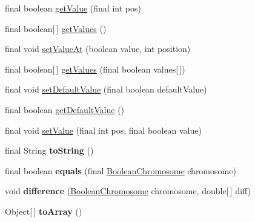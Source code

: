 \begin{DoxyCompactItemize}
\item 
final boolean \hyperlink{classjenes_1_1chromosome_1_1_boolean_chromosome_a6edb214f001732cfd6af9bbac3a23515}{get\-Value} (final int pos)
\item 
final boolean\mbox{[}$\,$\mbox{]} \hyperlink{classjenes_1_1chromosome_1_1_boolean_chromosome_a27db9ee77a97d896d0cdafc726681272}{get\-Values} ()
\item 
final void \hyperlink{classjenes_1_1chromosome_1_1_boolean_chromosome_a9bd35e276f2739f19fa7a695c85f415c}{set\-Value\-At} (boolean value, int position)
\item 
final boolean\mbox{[}$\,$\mbox{]} \hyperlink{classjenes_1_1chromosome_1_1_boolean_chromosome_aafccb6ebf217d02c0502e185b1972f82}{get\-Values} (final boolean values\mbox{[}$\,$\mbox{]})
\item 
final void \hyperlink{classjenes_1_1chromosome_1_1_boolean_chromosome_a3730cbcd4d048349f134593db820566d}{set\-Default\-Value} (final boolean default\-Value)
\item 
final boolean \hyperlink{classjenes_1_1chromosome_1_1_boolean_chromosome_a9b75f626b2b5fbc90215a53ac91d24a7}{get\-Default\-Value} ()
\item 
final void \hyperlink{classjenes_1_1chromosome_1_1_boolean_chromosome_ab37e05ed7a30e43b740f0c2d9c548e88}{set\-Value} (final int pos, final boolean value)
\item 
\hypertarget{classjenes_1_1chromosome_1_1_boolean_chromosome_a17ecce8325cc2ba6b1703551768c245f}{final String {\bfseries to\-String} ()}\label{classjenes_1_1chromosome_1_1_boolean_chromosome_a17ecce8325cc2ba6b1703551768c245f}

\item 
\hypertarget{classjenes_1_1chromosome_1_1_boolean_chromosome_a82b50fe50a7e8821ee3ae5cc96bca013}{final boolean {\bfseries equals} (final \hyperlink{classjenes_1_1chromosome_1_1_boolean_chromosome}{Boolean\-Chromosome} chromosome)}\label{classjenes_1_1chromosome_1_1_boolean_chromosome_a82b50fe50a7e8821ee3ae5cc96bca013}

\item 
\hypertarget{classjenes_1_1chromosome_1_1_boolean_chromosome_a0d602ca5a958ee2712963602d2f1eee9}{void {\bfseries difference} (\hyperlink{classjenes_1_1chromosome_1_1_boolean_chromosome}{Boolean\-Chromosome} chromosome, double\mbox{[}$\,$\mbox{]} diff)}\label{classjenes_1_1chromosome_1_1_boolean_chromosome_a0d602ca5a958ee2712963602d2f1eee9}

\item 
\hypertarget{classjenes_1_1chromosome_1_1_boolean_chromosome_a3ff06b819a640b0e89935d99cc69d3ac}{Object\mbox{[}$\,$\mbox{]} {\bfseries to\-Array} ()}\label{classjenes_1_1chromosome_1_1_boolean_chromosome_a3ff06b819a640b0e89935d99cc69d3ac}

\end{DoxyCompactItemize}


